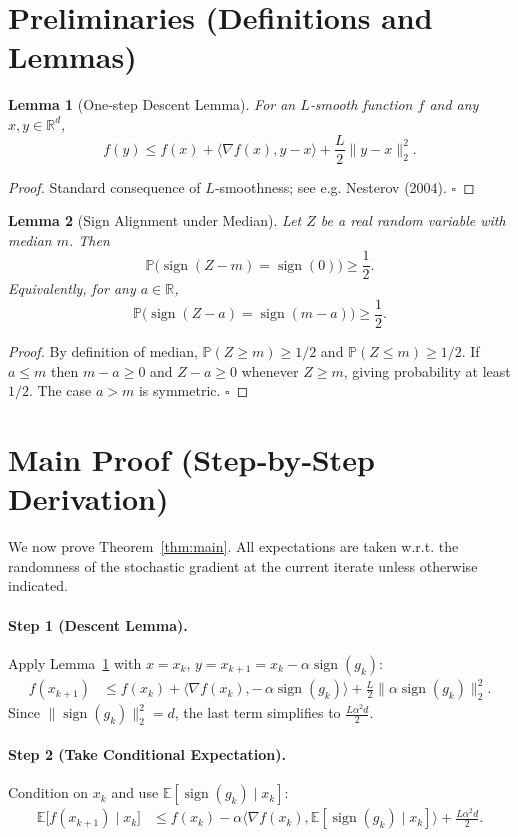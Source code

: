 \documentclass[11pt]{article}
\newtheorem{lemma}{Lemma}
\newcommand{\sign}{\operatorname{sign}}
\newcommand{\E}{\mathbb{E}}
\newcommand{\R}{\mathbb{R}}
\begin{document}
\newpage
\section*{Preliminaries (Definitions and Lemmas)}
\begin{lemma}[One‑step Descent Lemma]\label{lem:descent}
For an $L$‑smooth function $f$ and any $x,y\in\R^{d}$,
\[
f(y)\le f(x)+\langle\nabla f(x),y-x\rangle+\frac{L}{2}\|y-x\|_2^{2}.
\]
\end{lemma}
\begin{proof}
Standard consequence of $L$‑smoothness; see e.g. Nesterov (2004). \hfill $\square$
\end{proof}

\begin{lemma}[Sign Alignment under Median]\label{lem:sign}
Let $Z$ be a real random variable with median $m$. Then
\[
\mathbb{P}\bigl(\sign(Z-m)=\sign(0)\bigr)\ge\frac12 .
\]
Equivalently, for any $a\in\R$,
\[
\mathbb{P}\bigl(\sign(Z-a)=\sign(m-a)\bigr)\ge\frac12 .
\]
\end{lemma}
\begin{proof}
By definition of median, $\mathbb{P}(Z\ge m)\ge 1/2$ and $\mathbb{P}(Z\le m)\ge 1/2$. If $a\le m$ then $m-a\ge0$ and $Z-a\ge0$ whenever $Z\ge m$, giving probability at least $1/2$. The case $a>m$ is symmetric. \hfill $\square$
\end{proof}

\section*{Main Proof (Step‑by‑Step Derivation)}
We now prove Theorem~\ref{thm:main}. All expectations are taken w.r.t. the randomness of the stochastic gradient at the current iterate unless otherwise indicated.

\paragraph{Step 1 (Descent Lemma).}
Apply Lemma~\ref{lem:descent} with $x=x_k$, $y=x_{k+1}=x_k-\alpha\sign(g_k)$:
\begin{align}
f(x_{k+1})
&\le f(x_k)+\big\langle \nabla f(x_k),-\,\alpha\sign(g_k)\big\rangle
   +\frac{L}{2}\big\|\alpha\sign(g_k)\big\|_2^{2} .
\label{eq:step1}
\end{align}
Since $\|\sign(g_k)\|_2^{2}=d$, the last term simplifies to $\frac{L\alpha^{2}d}{2}$.

\paragraph{Step 2 (Take Conditional Expectation).}
Condition on $x_k$ and use $\E[\sign(g_k)\mid x_k]$:
\begin{align}
\E\!\bigl[f(x_{k+1})\mid x_k\bigr]
&\le f(x_k)-\alpha\big\langle \nabla f(x_k),\E[\sign(g_k)\mid x_k]\big\rangle
   +\frac{L\alpha^{2}d}{2}. 
\label{eq:step2}
\end{align}
\end{document}
